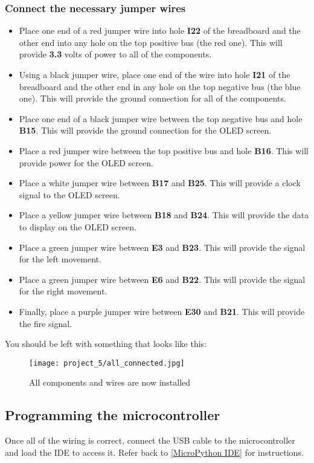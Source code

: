 \subsubsection{Connect the necessary jumper wires}
\begin{itemize}
    \item Place one end of a red jumper wire into hole \textbf{I22} of the breadboard and the other end into
    any hole on the top positive bus (the red one). This will provide \textbf{3.3} volts of power to all of the components.
    \item Using a black jumper wire, place one end of the wire into hole \textbf{I21} of the breadboard and the other
    end in any hole on the top negative bus (the blue one). This will provide the ground connection for all of the components.
    \item Place one end of a black jumper wire between the top negative bus and hole \textbf{B15}. This will provide the ground connection
    for the OLED screen.
    \item Place a red jumper wire between the top positive bus and hole \textbf{B16}. This will provide power for the OLED screen.
    \item Place a white jumper wire between \textbf{B17} and \textbf{B25}. This will provide a clock signal to the OLED screen.
    \item Place a yellow jumper wire between \textbf{B18} and \textbf{B24}. This will provide the data to display on the OLED screen.
    \item Place a green jumper wire between \textbf{E3} and \textbf{B23}. This will provide the signal for the left movement.
    \item Place a green jumper wire between \textbf{E6} and \textbf{B22}. This will provide the signal for the right movement.
    \item Finally, place a purple jumper wire between \textbf{E30} and \textbf{B21}. This will provide the fire signal.
\end{itemize}

You should be left with something that looks like this:
\begin{figure}[H]
    \centering
    \texttt{[image: project\_5/all\_connected.jpg]}
    \caption{All components and wires are now installed}
\end{figure}

\subsection{Programming the microcontroller}
Once all of the wiring is correct, connect the USB cable to the microcontroller and load the IDE to
access it. Refer back to \ref{MicroPython IDE} for instructions.

